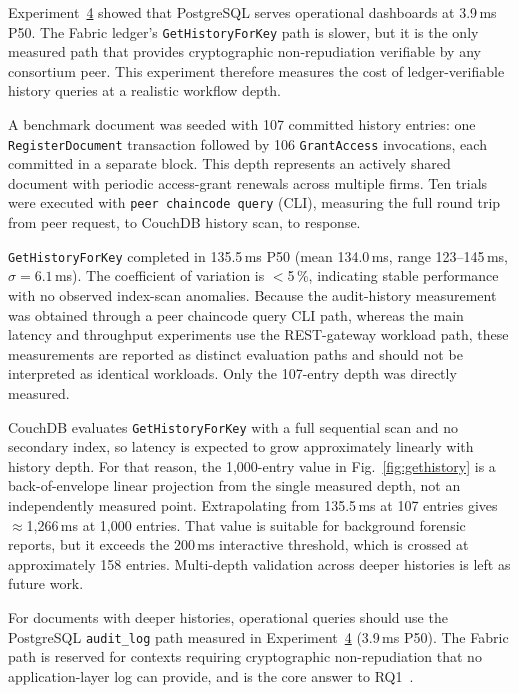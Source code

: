 \documentclass{ieeeaccess}
\begin{document}
Experiment~\hyperref[sec:exp_audit]{4} showed that PostgreSQL serves operational dashboards at
3.9\,ms P50. The Fabric ledger's \texttt{GetHistoryForKey} path is slower,
but it is the only measured path that provides cryptographic
non-repudiation verifiable by any consortium peer. This experiment
therefore measures the cost of ledger-verifiable history queries at a
realistic workflow depth.

A benchmark document was seeded with 107 committed history entries:
one \texttt{RegisterDocument} transaction followed by 106
\texttt{GrantAccess} invocations, each committed in a separate block. This
depth represents an actively shared document with periodic access-grant
renewals across multiple firms. Ten trials were executed with
\texttt{peer chaincode query} (CLI), measuring the full round trip from peer
request, to CouchDB history scan, to response.

\texttt{GetHistoryForKey} completed in 135.5\,ms P50 (mean 134.0\,ms,
range 123--145\,ms, $\sigma = 6.1$\,ms). The coefficient of variation is
$<$5\,\%, indicating stable performance with no observed index-scan
anomalies. Because the audit-history measurement was obtained through a peer
chaincode query CLI path, whereas the main latency and throughput experiments
use the REST-gateway workload path, these measurements are reported as
distinct evaluation paths and should not be interpreted as identical
workloads. Only the 107-entry depth was directly measured.

CouchDB evaluates \texttt{GetHistoryForKey} with a full sequential scan and
no secondary index, so latency is expected to grow approximately linearly
with history depth. For that reason, the 1,000-entry value in
Fig.~\ref{fig:gethistory} is a back-of-envelope linear projection from the
single measured depth, not an independently measured point. Extrapolating
from 135.5\,ms at 107 entries gives $\approx$1,266\,ms at 1,000 entries.
That value is suitable for background forensic reports, but it exceeds the
200\,ms interactive threshold, which is crossed at approximately 158
entries. Multi-depth validation across deeper histories is left as future
work.

For documents with deeper histories, operational queries should use the
PostgreSQL \texttt{audit\_log} path measured in Experiment~\hyperref[sec:exp_audit]{4} (3.9\,ms P50).
The Fabric path is reserved for contexts requiring cryptographic
non-repudiation that no application-layer log can provide, and is the core
answer to RQ1~\cite{nistir8202,fabricChaincodeStubDoc}.
\end{document}
